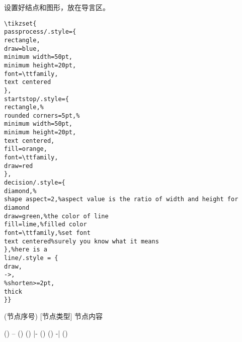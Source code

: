 设置好结点和图形，放在导言区。
\begin{lstlisting}
\tikzset{
passprocess/.style={
rectangle,
draw=blue,
minimum width=50pt,
minimum height=20pt,
font=\ttfamily,
text centered
},
startstop/.style={
rectangle,%
rounded corners=5pt,%
minimum width=50pt,
minimum height=20pt,
text centered,
fill=orange,
font=\ttfamily,
draw=red
},
decision/.style={
diamond,%
shape aspect=2,%aspect value is the ratio of width and height for diamond
draw=green,%the color of line
fill=lime,%filled color
font=\ttfamily,%set font
text centered%surely you know what it means
},%here is a
line/.style = {
draw,
->,
%shorten>=2pt,
thick
}}
\end{lstlisting}


\begin{cmd}[label=流程图命令]
\node (节点序号) [节点类型] {节点内容} %
\begin{scope}[every path/.style=line] %
\path () -- () %
\path () |- () %
\path () -| () %
\end{scope}
\end{cmd}


